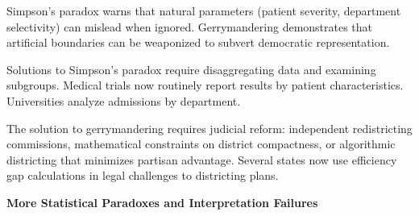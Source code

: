 Simpson's paradox warns that natural parameters (patient severity, department selectivity) can mislead when ignored. Gerrymandering demonstrates that artificial boundaries can be weaponized to subvert democratic representation.

Solutions to Simpson's paradox require disaggregating data and examining subgroups. Medical trials now routinely report results by patient characteristics. Universities analyze admissions by department.

The solution to gerrymandering requires judicial reform: independent redistricting commissions, mathematical constraints on district compactness, or algorithmic districting that minimizes partisan advantage. Several states now use efficiency gap calculations in legal challenges to districting plans.

\vspace*{\fill}

\clearpage

\begin{center}
{\Large \textbf{More Statistical Paradoxes and Interpretation Failures}}

\end{center}

\vspace{1em}

